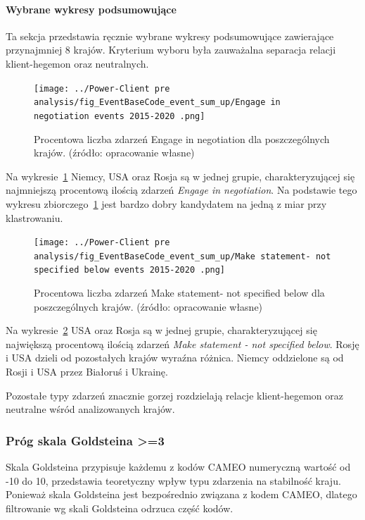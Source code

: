\documentclass[11pt]{report}
\begin{document}
    \paragraph{Wybrane wykresy podsumowujące}
    Ta sekcja przedstawia ręcznie wybrane wykresy podsumowujące zawierające przynajmniej 8 krajów.
    Kryterium wyboru była zauważalna separacja relacji klient-hegemon oraz neutralnych.

    \begin{figure}[!htp]
        \centering
        \texttt{[image: ../Power-Client pre analysis/fig\_EventBaseCode\_event\_sum\_up/Engage in negotiation events 2015-2020 .png]}
        \caption{Procentowa liczba zdarzeń Engage in negotiation dla poszczególnych krajów. (źródło: opracowanie własne)}
        \label{fig:Power-Client:ERC:SumUp:Engage in negotiation}
    \end{figure}
    Na wykresie~\ref{fig:Power-Client:ERC:SumUp:Engage in negotiation} Niemcy, USA oraz Rosja są w jednej grupie,
    charakteryzującej się najmniejszą procentową ilością zdarzeń \textit{Engage in negotiation}.
    Na podstawie tego wykresu zbiorczego~\ref{fig:Power-Client:ERC:SumUp:Engage in negotiation}
    jest bardzo dobry kandydatem na jedną z miar przy klastrowaniu.

    \begin{figure}[!htp]
        \centering
        \texttt{[image: ../Power-Client pre analysis/fig\_EventBaseCode\_event\_sum\_up/Make statement- not specified below events 2015-2020 .png]}
        \caption{Procentowa liczba zdarzeń Make statement- not specified below dla poszczególnych krajów. (źródło: opracowanie własne)}
        \label{fig:Power-Client:ERC:SumUp:Make statement - not specified below}
    \end{figure}
    Na wykresie~\ref{fig:Power-Client:ERC:SumUp:Make statement - not specified below} USA oraz Rosja są w jednej grupie,
    charakteryzującej się największą procentową ilością zdarzeń \textit{Make statement - not specified below}.
    Rosję i USA dzieli od pozostałych krajów wyraźna różnica.
    Niemcy oddzielone są od Rosji i USA przez Białoruś i Ukrainę.

    Pozostałe typy zdarzeń znacznie gorzej rozdzielają relacje klient-hegemon oraz neutralne wśród analizowanych krajów.

    \subsubsection{Próg skala Goldsteina >=3}
    Skala Goldsteina przypisuje każdemu z kodów CAMEO numeryczną wartość od -10 do 10, przedstawia teoretyczny wpływ typu zdarzenia na stabilność kraju.
    Ponieważ skala Goldsteina jest bezpośrednio związana z kodem CAMEO, dlatego filtrowanie wg skali Goldsteina odrzuca część kodów.
\end{document}
